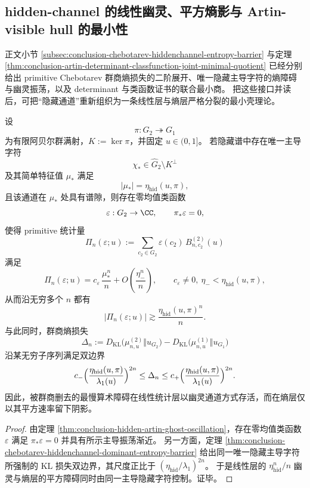 \subsection{hidden-channel 的线性幽灵、平方熵影与 Artin-visible hull 的最小性}

正文小节 \ref{subsec:conclusion-chebotarev-hiddenchannel-entropy-barrier}
与定理 \ref{thm:conclusion-artin-determinant-classfunction-joint-minimal-quotient}
已经分别给出 primitive Chebotarev 群商熵损失的二阶展开、唯一隐藏主导字符的熵障碍与幽灵振荡，以及 determinant 与类函数证书的联合最小商。
把这些接口并读后，可把“隐藏通道”重新组织为一条线性层与熵层严格分裂的最小壳理论。

\begin{theorem}\label{thm:derived-hiddenchannel-linear-ghost-quadratic-shadow}
设
\[
\pi:G_2\twoheadrightarrow G_1
\]
为有限阿贝尔群满射，\(K:=\ker\pi\)，并固定 \(u\in(0,1]\)。
若隐藏谱中存在唯一主导字符
\[
\chi_\ast\in \widehat G_2\setminus K^\perp
\]
及其简单特征值 \(\mu_\ast\) 满足
\[
|\mu_\ast|=\eta_{\mathrm{hid}}(u,\pi),
\]
且该通道在 \(\mu_\ast\) 处具有谱隙，则存在零均值类函数
\[
\varepsilon:G_2\to\CC,
\qquad
\pi_\ast\varepsilon=0,
\]
使得 primitive 统计量
\[
\Pi_n(\varepsilon;u):=\sum_{c_2\in G_2}\varepsilon(c_2)\,B_{n,c_2}^{(2)}(u)
\]
满足
\[
\Pi_n(\varepsilon;u)
=
c_\varepsilon\,\frac{\mu_\ast^n}{n}
+
O\!\left(\frac{\eta_-^n}{n}\right),
\qquad
c_\varepsilon\neq 0,\ \eta_-<\eta_{\mathrm{hid}}(u,\pi),
\]
从而沿无穷多个 \(n\) 都有
\[
|\Pi_n(\varepsilon;u)|
\gtrsim
\frac{\eta_{\mathrm{hid}}(u,\pi)^n}{n}.
\]
与此同时，群商熵损失
\[
\Delta_n:=
D_{\mathrm{KL}}\!\bigl(\mu_{n,u}^{(2)}\Vert u_{G_2}\bigr)
-
D_{\mathrm{KL}}\!\bigl(\mu_{n,u}^{(1)}\Vert u_{G_1}\bigr)
\]
沿某无穷子序列满足双边界
\[
c_-\Bigl(\frac{\eta_{\mathrm{hid}}(u,\pi)}{\lambda_1(u)}\Bigr)^{2n}
\le
\Delta_n
\le
c_+\Bigl(\frac{\eta_{\mathrm{hid}}(u,\pi)}{\lambda_1(u)}\Bigr)^{2n}.
\]
因此，被群商删去的最慢算术障碍在线性统计层以幽灵通道方式存活，而在熵层仅以其平方速率留下阴影。
\end{theorem}

\begin{proof}
由定理 \ref{thm:conclusion-hidden-artin-ghost-oscillation}，存在零均值类函数 \(\varepsilon\) 满足
\(\pi_\ast\varepsilon=0\)
并具有所示主导振荡渐近。
另一方面，定理
\ref{thm:conclusion-chebotarev-hiddenchannel-dominant-entropy-barrier}
给出同一唯一隐藏主导字符所强制的 KL 损失双边界，其尺度正比于
\(
(\eta_{\mathrm{hid}}/\lambda_1)^{2n}
\)。
于是线性层的 \(\eta_{\mathrm{hid}}^n/n\) 幽灵与熵层的平方障碍同时由同一主导隐藏字符控制。证毕。
\end{proof}

